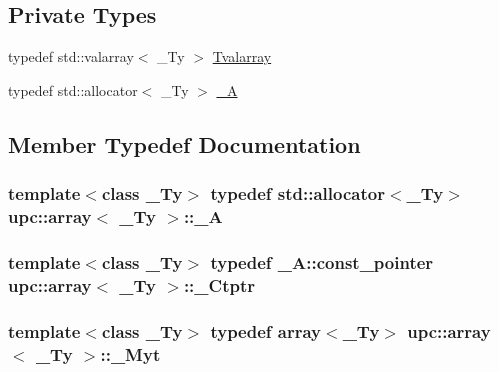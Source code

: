 \subsection*{Private Types}
\begin{DoxyCompactItemize}
\item 
typedef std\+::valarray$<$ \+\_\+\+Ty $>$ \hyperlink{classupc_1_1array_a2d2187ace46e59d689195d96a53e9965}{Tvalarray}
\item 
typedef std\+::allocator$<$ \+\_\+\+Ty $>$ \hyperlink{classupc_1_1array_a5eeaa143aa0b098c7402952d1f9c7ea7}{\+\_\+A}
\end{DoxyCompactItemize}


\subsection{Member Typedef Documentation}
\subsubsection[{\texorpdfstring{\+\_\+A}{_A}}]{\setlength{\rightskip}{0pt plus 5cm}template$<$class \+\_\+\+Ty$>$ typedef std\+::allocator$<$\+\_\+\+Ty$>$ {\bf upc\+::array}$<$ \+\_\+\+Ty $>$\+::{\bf \+\_\+A}\hspace{0.3cm}{\ttfamily [private]}}\hypertarget{classupc_1_1array_a5eeaa143aa0b098c7402952d1f9c7ea7}{}\label{classupc_1_1array_a5eeaa143aa0b098c7402952d1f9c7ea7}
\subsubsection[{\texorpdfstring{\+\_\+\+Ctptr}{_Ctptr}}]{\setlength{\rightskip}{0pt plus 5cm}template$<$class \+\_\+\+Ty$>$ typedef \+\_\+\+A\+::const\+\_\+pointer {\bf upc\+::array}$<$ \+\_\+\+Ty $>$\+::{\bf \+\_\+\+Ctptr}}\hypertarget{classupc_1_1array_a420718228a4d845721303a19755f0d42}{}\label{classupc_1_1array_a420718228a4d845721303a19755f0d42}
\subsubsection[{\texorpdfstring{\+\_\+\+Myt}{_Myt}}]{\setlength{\rightskip}{0pt plus 5cm}template$<$class \+\_\+\+Ty$>$ typedef {\bf array}$<$\+\_\+\+Ty$>$ {\bf upc\+::array}$<$ \+\_\+\+Ty $>$\+::{\bf \+\_\+\+Myt}}\hypertarget{classupc_1_1array_a9c800a9bf971fc1d7c02a34803f87115}{}\label{classupc_1_1array_a9c800a9bf971fc1d7c02a34803f87115}
